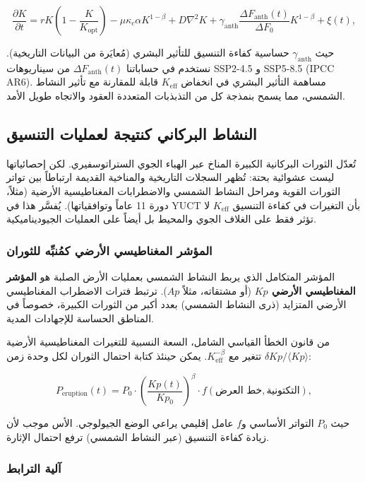 \documentclass[11pt,a4paper]{article}
\newcommand{\Keff}{K_{\mathrm{eff}}}
\begin{document}
	\[
	\frac{\partial K}{\partial t} = r K \left(1 - \frac{K}{K_{\mathrm{opt}}}\right) - \mu \kappa_c \alpha K^{1-\beta} 
	+ D\nabla^2 K + \gamma_{\mathrm{anth}} \frac{\Delta F_{\mathrm{anth}}(t)}{\Delta F_0} K^{1-\beta} + \xi(t),
	\]
	
	حيث \(\gamma_{\mathrm{anth}}\) حساسية كفاءة التنسيق للتأثير البشري (مُعايَرة من البيانات التاريخية). نستخدم في حساباتنا \(\Delta F_{\mathrm{anth}}(t)\) من سيناريوهات SSP2-4.5 و SSP5-8.5 (IPCC AR6). مساهمة التأثير البشري في انخفاض \(K_{\mathrm{eff}}\) قابلة للمقارنة مع تأثير النشاط الشمسي، مما يسمح بنمذجة كل من التذبذبات المتعددة العقود والاتجاه طويل الأمد.
	
	\subsection{النشاط البركاني كنتيجة لعمليات التنسيق}
	
	تُعدّل الثورات البركانية الكبيرة المناخ عبر الهباء الجوي الستراتوسفيري. لكن إحصائياتها ليست عشوائية بحتة: تُظهر السجلات التاريخية والمناخية القديمة ارتباطاً بين تواتر الثورات القوية ومراحل النشاط الشمسي والاضطرابات المغناطيسية الأرضية (مثلاً، دورة 11 عاماً وتوافقياتها). يُفسَّر هذا في YUCT بأن التغيرات في كفاءة التنسيق \(\Keff\) لا تؤثر فقط على الغلاف الجوي والمحيط بل أيضاً على العمليات الجيوديناميكية.
	
	\subsubsection{المؤشر المغناطيسي الأرضي كمُنبِّه للثوران}
	
	المؤشر المتكامل الذي يربط النشاط الشمسي بعمليات الأرض الصلبة هو \textbf{المؤشر المغناطيسي الأرضي \(Kp\)} (أو مشتقاته، مثلاً \(Ap\)). ترتبط فترات الاضطراب المغناطيسي الأرضي المتزايد (ذرى النشاط الشمسي) بعدد أكبر من الثورات الكبيرة، خصوصاً في المناطق الحساسة للإجهادات المدية.
	
	من قانون الخطأ القياسي الشامل، السعة النسبية للتغيرات المغناطيسية الأرضية \(\delta Kp / \langle Kp \rangle\) تتغير مع \(\Keff^{-\beta}\). يمكن حينئذ كتابة احتمال الثوران لكل وحدة زمن:
	
	\[
	P_{\text{eruption}}(t) = P_0 \cdot \left( \frac{Kp(t)}{Kp_0} \right)^{\beta} \cdot f(\text{خط العرض}, \text{التكتونية}),
	\]
	
	حيث \(P_0\) التواتر الأساسي و\(f\) عامل إقليمي يراعي الوضع الجيولوجي. الأس موجب لأن زيادة كفاءة التنسيق (عبر النشاط الشمسي) ترفع احتمال الإثارة.
	
	\subsubsection{آلية الترابط}
	
\end{document}
